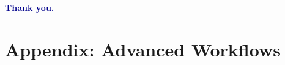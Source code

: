 \documentclass[aspectratio=169, 11pt]{beamer}
\begin{document}
{
\begin{frame}[plain]
\vfill
\begin{center}
  {\Large\bfseries\textcolor{darkblue}{Thank you.}}\\[12pt]
\end{center}
\vfill
\end{frame}
}


\section*{Appendix: Advanced Workflows}
\end{document}
